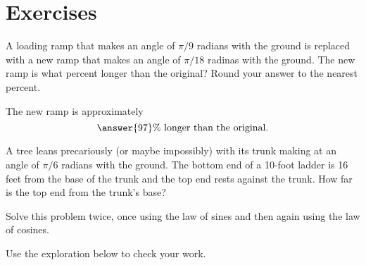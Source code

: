 \documentclass{ximera}
\begin{document}
\section{Exercises}

\begin{question} \label{Q0:SineCosine}
A loading ramp that makes an angle of $\pi/9$ radians with the ground is replaced with a new ramp that makes an angle of $\pi/18$ radinas with the ground. The new ramp is what percent longer than the original? Round your answer to the nearest percent.

The new ramp is approximately 
\[
   \answer{97}\% \text{ longer than the original.}
\]


\end{question}


\begin{question} \label{Q00:SineCosine}
A tree leans precariously (or maybe impossibly) with its trunk making at an angle of $\pi/6$ radians with the ground. The bottom end of a 10-foot ladder is 16 feet from the base of the trunk and the top end rests against the trunk. How far is the top end from the trunk's base? 

Solve this problem twice, once using the law of sines and then again using the law of cosines.

Use the exploration below to check your work.

\begin{exploration}

 
\begin{onlineOnly}
    \begin{center}
\end{center}
\end{onlineOnly}
\end{exploration} 

\end{question}
\end{document}
